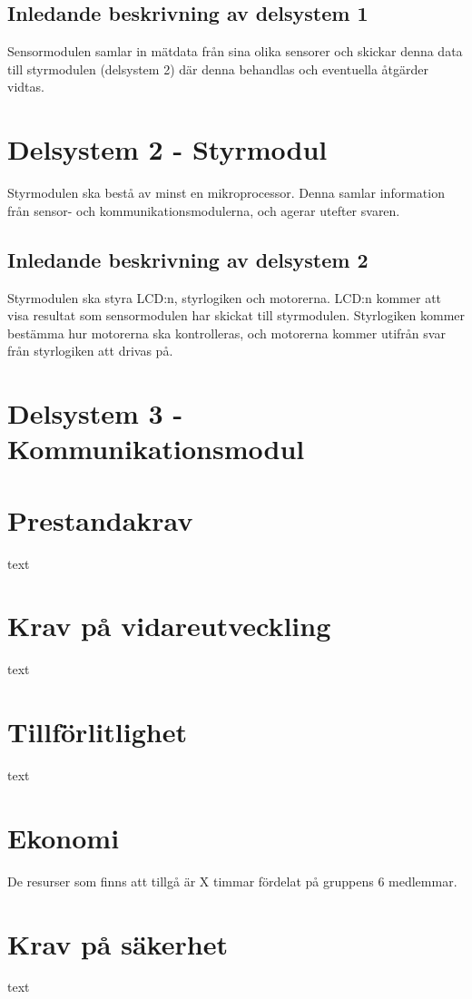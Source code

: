 \documentclass[11pt]{article}
\begin{document}
\begin{flushleft}
\subsection{Inledande beskrivning av delsystem 1}
Sensormodulen samlar in mätdata från sina olika sensorer och skickar denna data till styrmodulen (delsystem 2) där denna behandlas och eventuella åtgärder vidtas.

\pagebreak

\section{Delsystem 2 - Styrmodul}
Styrmodulen ska bestå av minst en mikroprocessor.  Denna samlar information från sensor- och kommunikationsmodulerna, och agerar utefter svaren.

\subsection{Inledande beskrivning av delsystem 2}
Styrmodulen ska styra LCD:n, styrlogiken och motorerna.
LCD:n kommer att visa resultat som sensormodulen har skickat till styrmodulen. Styrlogiken kommer bestämma hur motorerna ska kontrolleras, och motorerna kommer utifrån svar från styrlogiken att drivas på.

\pagebreak

\section{Delsystem 3 - Kommunikationsmodul}

\pagebreak

\section{Prestandakrav}
text
\section{Krav på vidareutveckling}
text
\section{Tillförlitlighet}
text
\section{Ekonomi}
De resurser som finns att tillgå är X timmar fördelat på gruppens 6 medlemmar. 
\section{Krav på säkerhet}
text


\end{flushleft}
\end{document}
